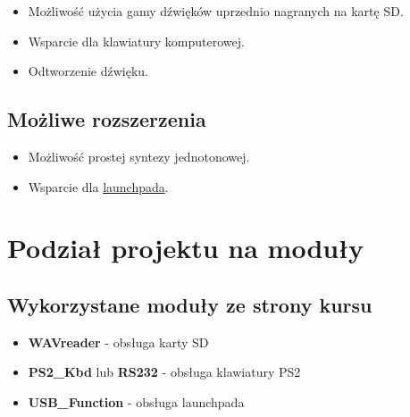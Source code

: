 \documentclass{article}
\begin{document}
\begin{itemize}
    \item Możliwość użycia gamy dźwięków uprzednio nagranych na kartę SD. 
    \item Wsparcie dla klawiatury komputerowej.
    \item Odtworzenie dźwięku.
\end{itemize} 

\subsection{Możliwe rozszerzenia}

\begin{itemize}
    \item Możliwość prostej syntezy jednotonowej.
    \item Wsparcie dla \href{https://pl.wikipedia.org/wiki/Launchpad}{launchpada}.
\end{itemize}

\begin{figure}[H]
    \centering
\end{figure}

\section{Podział projektu na moduły}

\subsection{Wykorzystane moduły ze strony kursu}

\begin{itemize}
    \item \textbf{WAVreader} - obsługa karty SD 
    \item \textbf{PS2\_Kbd} lub \textbf{RS232} - obsługa klawiatury PS2 
    \item \textbf{USB\_Function} - obsługa launchpada  %
\end{itemize}
\end{document}
